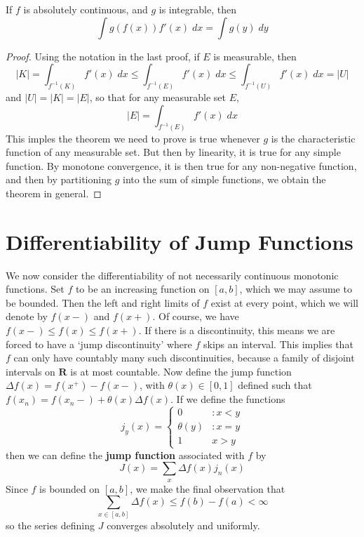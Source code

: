 \begin{theorem}
  If $f$ is absolutely continuous, and $g$ is integrable, then
  \[ \int g(f(x)) f'(x)\; dx = \int g(y)\; dy \]
\end{theorem}
\begin{proof}
  Using the notation in the last proof, if $E$ is measurable, then
  \[ |K| = \int_{f^{-1}(K)} f'(x)\; dx \leq \int_{f^{-1}(E)} f'(x)\; dx \leq \int_{f^{-1}(U)} f'(x)\; dx = |U| \]
  and $|U| = |K| = |E|$, so that for any measurable set $E$,
  \[ |E| = \int_{f^{-1}(E)} f'(x)\; dx \]
  This imples the theorem we need to prove is true whenever $g$ is the characteristic function of any measurable set. But then by linearity, it is true for any simple function. By monotone convergence, it is then true for any non-negative function, and then by partitioning $g$ into the sum of simple functions, we obtain the theorem in general.
\end{proof}





\section{Differentiability of Jump Functions}

We now consider the differentiability of not necessarily continuous monotonic functions. Set $f$ to be an increasing function on $[a,b]$, which we may assume to be bounded.  Then the left and right limits of $f$ exist at every point, which we will denote by $f(x-)$ and $f(x+)$. Of course, we have $f(x-) \leq f(x) \leq f(x+)$. If there is a discontinuity, this means we are forced to have a `jump discontinuity' where $f$ skips an interval. This implies that $f$ can only have countably many such discontinuities, because a family of disjoint intervals on $\mathbf{R}$ is at most countable. Now define the jump function $\Delta f(x) = f(x^+) - f(x-)$, with $\theta(x) \in [0,1]$ defined such that $f(x_n) = f(x_n-) + \theta(x) \Delta f(x)$. If we define the functions
%
\[ j_y(x) = \begin{cases} 0 & : x < y \\ \theta(y) & : x = y \\ 1 & x > y \end{cases} \]
%
then we can define the {\bf jump function} associated with $f$ by
%
\[ J(x) = \sum_x \Delta f(x) j_n(x) \]
%
Since $f$ is bounded on $[a,b]$, we make the final observation that
%
\[ \sum_{x \in [a,b]} \Delta f(x) \leq f(b) - f(a) < \infty \]
%
so the series defining $J$ converges absolutely and uniformly.

